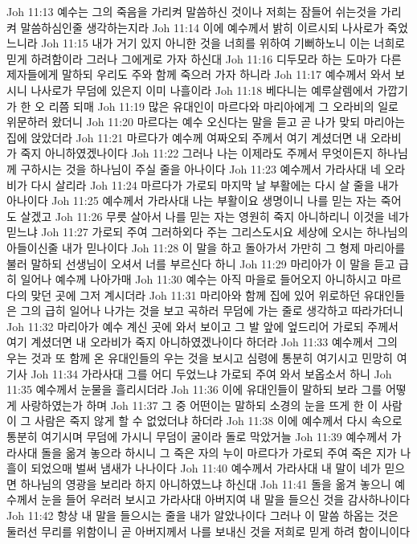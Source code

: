 Joh 11:13  예수는 그의 죽음을 가리켜 말씀하신 것이나 저희는 잠들어 쉬는것을 가리켜 말씀하심인줄 생각하는지라
Joh 11:14  이에 예수께서 밝히 이르시되 나사로가 죽었느니라
Joh 11:15  내가 거기 있지 아니한 것을 너희를 위하여 기뻐하노니 이는 너희로 믿게 하려함이라 그러나 그에게로 가자 하신대
Joh 11:16  디두모라 하는 도마가 다른 제자들에게 말하되 우리도 주와 함께 죽으러 가자 하니라
Joh 11:17  예수께서 와서 보시니 나사로가 무덤에 있은지 이미 나흘이라
Joh 11:18  베다니는 예루살렘에서 가깝기가 한 오 리쯤 되매
Joh 11:19  많은 유대인이 마르다와 마리아에게 그 오라비의 일로 위문하러 왔더니
Joh 11:20  마르다는 예수 오신다는 말을 듣고 곧 나가 맞되 마리아는 집에 앉았더라
Joh 11:21  마르다가 예수께 여짜오되 주께서 여기 계셨더면 내 오라비가 죽지 아니하였겠나이다
Joh 11:22  그러나 나는 이제라도 주께서 무엇이든지 하나님께 구하시는 것을 하나님이 주실 줄을 아나이다
Joh 11:23  예수께서 가라사대 네 오라비가 다시 살리라
Joh 11:24  마르다가 가로되 마지막 날 부활에는 다시 살 줄을 내가 아나이다
Joh 11:25  예수께서 가라사대 나는 부활이요 생명이니 나를 믿는 자는 죽어도 살겠고
Joh 11:26  무릇 살아서 나를 믿는 자는 영원히 죽지 아니하리니 이것을 네가 믿느냐
Joh 11:27  가로되 주여 그러하외다 주는 그리스도시요 세상에 오시는 하나님의 아들이신줄 내가 믿나이다
Joh 11:28  이 말을 하고 돌아가서 가만히 그 형제 마리아를 불러 말하되 선생님이 오셔서 너를 부르신다 하니
Joh 11:29  마리아가 이 말을 듣고 급히 일어나 예수께 나아가매
Joh 11:30  예수는 아직 마을로 들어오지 아니하시고 마르다의 맞던 곳에 그저 계시더라
Joh 11:31  마리아와 함께 집에 있어 위로하던 유대인들은 그의 급히 일어나 나가는 것을 보고 곡하러 무덤에 가는 줄로 생각하고 따라가더니
Joh 11:32  마리아가 예수 계신 곳에 와서 보이고 그 발 앞에 엎드리어 가로되 주께서 여기 계셨더면 내 오라비가 죽지 아니하였겠나이다 하더라
Joh 11:33  예수께서 그의 우는 것과 또 함께 온 유대인들의 우는 것을 보시고 심령에 통분히 여기시고 민망히 여기사
Joh 11:34  가라사대 그를 어디 두었느냐 가로되 주여 와서 보옵소서 하니
Joh 11:35  예수께서 눈물을 흘리시더라
Joh 11:36  이에 유대인들이 말하되 보라 그를 어떻게 사랑하였는가 하며
Joh 11:37  그 중 어떤이는 말하되 소경의 눈을 뜨게 한 이 사람이 그 사람은 죽지 않게 할 수 없었더냐 하더라
Joh 11:38  이에 예수께서 다시 속으로 통분히 여기시며 무덤에 가시니 무덤이 굴이라 돌로 막았거늘
Joh 11:39  예수께서 가라사대 돌을 옮겨 놓으라 하시니 그 죽은 자의 누이 마르다가 가로되 주여 죽은 지가 나흘이 되었으매 벌써 냄새가 나나이다
Joh 11:40  예수께서 가라사대 내 말이 네가 믿으면 하나님의 영광을 보리라 하지 아니하였느냐 하신대
Joh 11:41  돌을 옮겨 놓으니 예수께서 눈을 들어 우러러 보시고 가라사대 아버지여 내 말을 들으신 것을 감사하나이다
Joh 11:42  항상 내 말을 들으시는 줄을 내가 알았나이다 그러나 이 말씀 하옵는 것은 둘러선 무리를 위함이니 곧 아버지께서 나를 보내신 것을 저희로 믿게 하려 함이니이다

